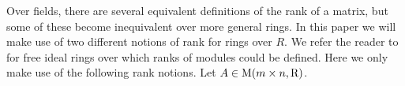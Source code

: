 Over fields, there are several equivalent definitions of the rank of a matrix, but some of these become inequivalent over more general rings. In this paper we will make use of two different notions of rank for rings over $R$. %
%
%
%
%
%
We refer the reader to \cite{Coh85} for free ideal rings over which ranks of modules could be defined. Here we only make use of the following rank notions. Let $A\in\mathrm{M}(m\times n, \mathrm{R})$.
